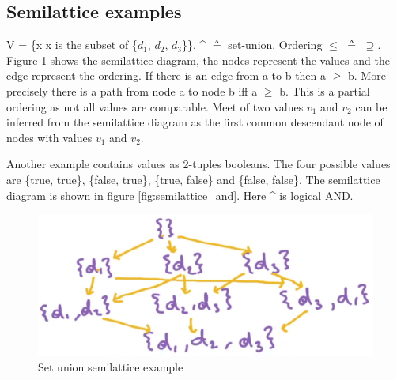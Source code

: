 \subsection{Semilattice examples}
V = \{x {\textbar} x is the subset of \{$d_{1}$, $d_{2}$, $d_{3}$\}\}, \^{} $\triangleq$ set-union, 
Ordering $\leq$ $\triangleq$ $\supseteq$. Figure \ref{fig:semilattice_union} shows the semilattice diagram, the nodes represent the values and the edge represent the ordering. If there is an edge from a to b then a $\geq$ b. More precisely there is a path from node a to node b iff a $\geq$ b. This is a partial ordering as not all values are comparable. Meet of two values $v_{1}$ and $v_{2}$ can be inferred from the semilattice diagram as the first common descendant node of nodes with values $v_{1}$ and $v_{2}$.\par
Another example contains values as 2-tuples booleans. The four possible values are \{true, true\}, \{false, true\}, \{true, false\} and \{false, false\}. The semilattice diagram is shown in figure \ref{fig:semilattice_and}. Here \^{} is logical AND.
\begin{figure}
    \centering
    \includegraphics[width=1\linewidth]{images/semilatticeSetUnion.png}
    \caption{Set union semilattice example}
    \label{fig:semilattice_union}
\end{figure}
